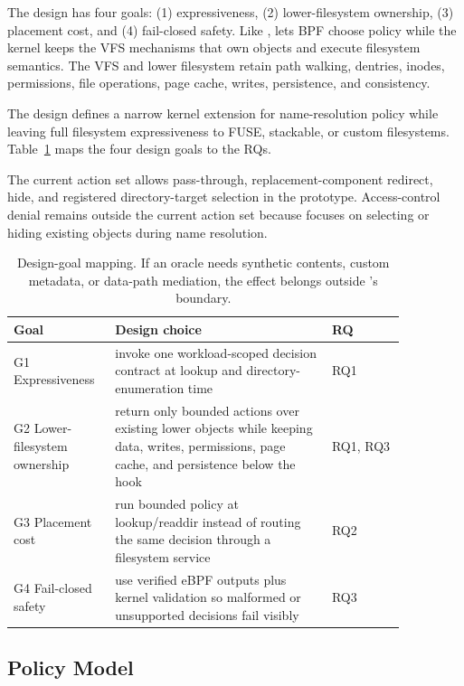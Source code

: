 The design has four goals: (1) expressiveness, (2) lower-filesystem ownership,
(3) placement cost, and (4) fail-closed safety. Like , \namei
lets BPF choose policy while the kernel keeps the VFS mechanisms that own
objects and execute filesystem semantics. The VFS and lower filesystem retain
path walking, dentries, inodes, permissions, file operations, page cache,
writes, persistence, and consistency.

The design defines a narrow kernel extension for name-resolution policy while
leaving full filesystem expressiveness to FUSE, stackable, or custom
filesystems. Table~\ref{tab:req-design} maps the four design goals to the RQs.

The current action set allows pass-through, replacement-component redirect,
hide, and registered directory-target selection in the prototype. Access-control
denial remains outside the current action set because \namei focuses on
selecting or hiding existing objects during name resolution.

\begin{table}[t]
\centering
\scriptsize
\begin{tabular}{@{}p{0.19\linewidth}p{0.5\linewidth}p{0.17\linewidth}@{}}
\hline
Goal & Design choice & RQ \\
\hline
G1 Expressiveness & invoke one workload-scoped decision contract at lookup and directory-enumeration time & RQ1 \\
G2 Lower-filesystem ownership & return only bounded actions over existing lower objects while keeping data, writes, permissions, page cache, and persistence below the hook & RQ1, RQ3 \\
G3 Placement cost & run bounded policy at lookup/readdir instead of routing the same decision through a filesystem service & RQ2 \\
G4 Fail-closed safety & use verified eBPF outputs plus kernel validation so malformed or unsupported decisions fail visibly & RQ3 \\
\hline
\end{tabular}
\caption{Design-goal mapping. If an oracle needs synthetic contents, custom
metadata, or data-path mediation, the effect belongs outside \namei's
boundary.}
\label{tab:req-design}
\end{table}

\subsection{Policy Model}

